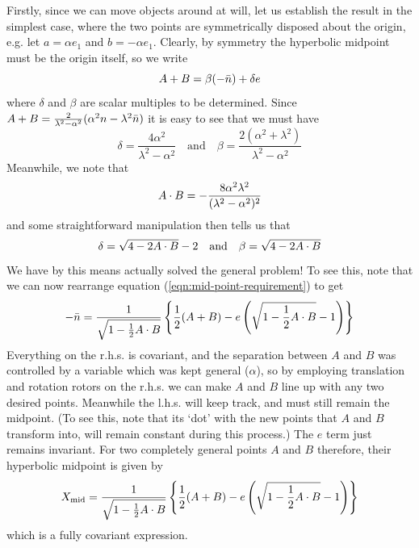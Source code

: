 Firstly, since we can move objects around at will, let us
establish the result in the simplest case, where the two
points are symmetrically disposed about the origin, e.g.
let $a=\alpha e_1$ and $b=-\alpha e_1$. Clearly, by
symmetry the hyperbolic midpoint must be the origin
itself, so we write
%
\begin{equation} \label{eqn:mid-point-requirement}
A+B = \beta (-\bar{n}) + \delta e
\end{equation}
%
where $\delta$ and $\beta$ are scalar multiples to be determined.
Since $A+B = \frac{2}{\lambda^2 - \alpha^2}(\alpha^2 n - \lambda^2
\bar{n})$ it is easy to see that we must have
%
\begin{equation}
\delta = \frac{4\alpha^2}{\lambda^2-\alpha^2} \quad
\text{and} \quad \beta =
\frac{2(\alpha^2+\lambda^2)}{\lambda^2-\alpha^2}
\end{equation}
%
Meanwhile, we note that
%
\begin{equation}
A\cdot B = -\frac{8 \alpha^2
\lambda^2}{(\lambda^2-\alpha^2)^2}
\end{equation}
%
and some straightforward manipulation then tells us that
%
\begin{equation} \label{eqn:delta-beta-results}
\delta=\sqrt{4-2 A\cdot B} -2 \quad \text{and} \quad \beta
= \sqrt{4-2 A\cdot B}
\end{equation}
%
We have by this means actually solved the general
problem! To see this, note that we can now rearrange
equation (\ref{eqn:mid-point-requirement}) to get
%
\begin{equation}
-\bar{n} = \frac{1}{\sqrt{1-\frac{1}{2} A \cdot B}} \left\{
\frac{1}{2} (A+B) - e \left(\sqrt{1-\frac{1}{2} A \cdot
B}-1\right) \right\}
\end{equation}
%
Everything on the r.h.s. is covariant, and the separation between
$A$ and $B$ was controlled by a variable which was kept general
($\alpha$), so by employing translation and rotation rotors on the
r.h.s. we can make $A$ and $B$ line up with any two desired
points. Meanwhile the l.h.s. will keep track, and must still
remain the midpoint. (To see this, note that its `dot' with the
new points that $A$ and $B$ transform into, will remain constant
during this process.) The $e$ term just remains invariant. For two
completely general points $A$ and $B$ therefore, their
hyperbolic midpoint is given by
%
\begin{equation} \label{eqn:mid-point-expr}
X_{\rm mid} = \frac{1}{\sqrt{1-\frac{1}{2} A \cdot B}}
\left\{ \frac{1}{2} (A+B) - e \left(\sqrt{1-\frac{1}{2} A \cdot
B}-1\right) \right\}
\end{equation}
%
which is a fully covariant expression.

